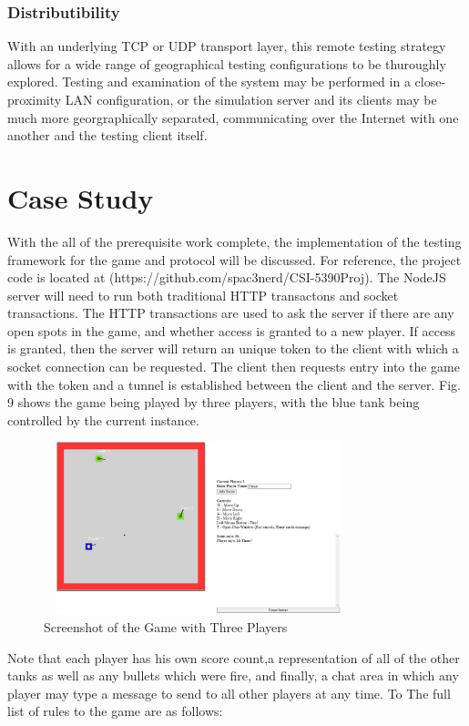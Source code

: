\documentclass[conference]{IEEEtran}
\begin{document}
\subsubsection{Distributibility}With an underlying TCP or UDP transport layer, this remote testing strategy allows for a wide range of geographical testing configurations to be thuroughly explored. Testing and examination of the system may be performed in a close-proximity LAN configuration, or the simulation server and its clients may be much more georgraphically separated, communicating over the Internet with one another and the testing client itself.


\section{Case Study}

With the all of the prerequisite work complete, the implementation of the testing framework for the game and protocol will be discussed. For reference,
the project code is located at (https://github.com/spac3nerd/CSI-5390Proj). The NodeJS server 
will need to run both traditional HTTP transactons and socket transactions. The HTTP transactions are used to ask the server if 
there are any open spots in the game, and whether access is granted to a new player. If access is granted, then the server will return 
an unique token to the client with which a socket connection can be requested. The client then requests entry into the game 
with the token and a tunnel is established between the client and the server. Fig. 9 shows the game being played by three players, with
the blue tank being controlled by the current instance.  


\begin{figure}[htbp]
\centerline{\includegraphics [width = 9cm, height = 5cm] {GameScreenshot.jpg}}
\caption{Screenshot of the Game with Three Players}
\end{figure}

Note that each player has his own score count,a representation of all of the other tanks as well as any bullets which were fire, and finally, a chat area
in which any player may type a message to send to all other players at any time. To The full list of rules to the game are as follows:
\end{document}
